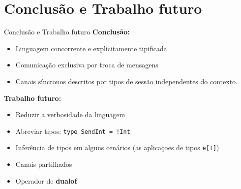 \section{Conclusão e Trabalho futuro}

\begin{frame}[fragile]{Conclusão e Trabalho futuro}
  \textbf{Conclusão:}
  \begin{itemize}
  \item Linguagem concorrente e explicitamente tipificada
  \item Comunicação exclusiva por troca de mensagens
  \item Canais síncronos descritos por tipos de sessão independentes do contexto.
  \end{itemize}
  \textbf{Trabalho futuro:}
  \begin{itemize}
  \item Reduzir a verbosidade da linguagem
  \item Abreviar tipos: \lstinline{type SendInt = !Int}
  \item Inferência de tipos em alguns cenários (as aplicaçoes de tipos \lstinline|e[T]|)
  \item Canais partilhados
  \item Operador de \textbf{dualof}    
  \end{itemize}
\end{frame}

